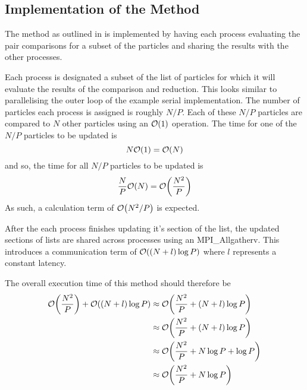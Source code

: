 %
%

\subsection{Implementation of the \pairoperation{} Method}

The \pairoperation{} method as outlined in
is implemented by having each process evaluating the pair
comparisons for a subset of the particles and sharing the
results with the other processes.

Each process is designated a subset of the list of particles for which
it will evaluate the results of the comparison and reduction.
%
This looks similar to parallelising the outer loop of the example
serial implementation.
%
The number of particles each process is assigned is roughly $N/P$.
%
Each of these $N/P$ particles are compared to $N$ other particles
using an $\mathcal{O}{\left({ 1 }\right)}$ operation.
%
The time for one of the $N/P$ particles to be updated is
\begin{equation}
    N\mathcal{O}{\left({ 1 }\right)} = \mathcal{O}{\left({ N }\right)}
\end  {equation}
and so, the time for all $N/P$ particles to be updated is
\begin{equation}
    \frac{N}{P}\mathcal{O}{\left({ N }\right)} = \mathcal{O}{\left({ \frac{N^2}{P} }\right)}
\end  {equation}
As such, a calculation term of $\mathcal{O}{\left({ N^2/P }\right)}$ is expected.

After the each process finishes updating it's section of the list,
the updated sections of lists are shared across processes using
an MPI\_Allgatherv.
This introduces a communication term of $\mathcal{O}{\left({ (N + l)\log{P} }\right)}$
where $l$ represents a constant latency.

The overall execution time of this method should therefore be
\begin{align}
    \mathcal{O}{\left({ \frac{N^2}{P} }\right)} + \mathcal{O}{\left({ (N+l)\log{P} }\right)}
        &\approx{} \mathcal{O}{\left({ \frac{N^2}{P} + (N+l)\log{P} }\right)} \\
        &\approx{} \mathcal{O}{\left({ \frac{N^2}{P} + (N+l)\log{P} }\right)} \\
        &\approx{} \mathcal{O}{\left({ \frac{N^2}{P} + N\log{P} + \log{P} }\right)} \\
        \label{eqn:v0_replicated_pair_operation_overall_time}
        &\approx{} \mathcal{O}{\left({ \frac{N^2}{P} + N\log{P} }\right)}
\end  {align}

\begin{figure}[!h]
    
    \caption{}
    \label{fig:v0_replicated_pair_operation_512_logtime}
\end  {figure}

